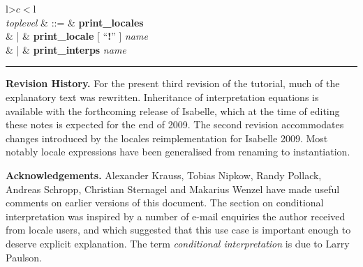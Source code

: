 \begin{isabellebody}
\begin{isamarkuptext}
\begin{table}
\begin{center}
\begin{tabular}{l>$c<$l}
   \\

  \textit{toplevel} & ::=
  & \textbf{print\_locales} \\
  & | & \textbf{print\_locale} [ ``\textbf{!}'' ] \textit{name} \\
  & | & \textbf{print\_interps} \textit{name}
\end{tabular}
\end{center}
\hrule
\caption{Syntax of Locale Commands.}
\label{tab:commands}
\end{table}%
\end{isamarkuptext}%
\isamarkuptrue%
%
\begin{isamarkuptext}%
\textbf{Revision History.}  For the present third revision of
  the tutorial, much of the explanatory text
  was rewritten.  Inheritance of interpretation equations is
  available with the forthcoming release of Isabelle, which at the
  time of editing these notes is expected for the end of 2009.
  The second revision accommodates changes introduced by the locales
  reimplementation for Isabelle 2009.  Most notably locale expressions
  have been generalised from renaming to instantiation.%
\end{isamarkuptext}%
\isamarkuptrue%
%
\begin{isamarkuptext}%
\textbf{Acknowledgements.}  Alexander Krauss, Tobias Nipkow,
  Randy Pollack, Andreas Schropp, Christian Sternagel and Makarius Wenzel
  have made
  useful comments on earlier versions of this document.  The section
  on conditional interpretation was inspired by a number of e-mail
  enquiries the author received from locale users, and which suggested
  that this use case is important enough to deserve explicit
  explanation.  The term \emph{conditional interpretation} is due to
  Larry Paulson.%
\end{isamarkuptext}%
\isamarkuptrue%
%
\isadelimtheory
%
\endisadelimtheory
%
\isatagtheory
{}\isamarkupfalse%
%
\endisatagtheory
{\isafoldtheory}%
%
\isadelimtheory
%
\endisadelimtheory
\isanewline
\end{isabellebody}%
